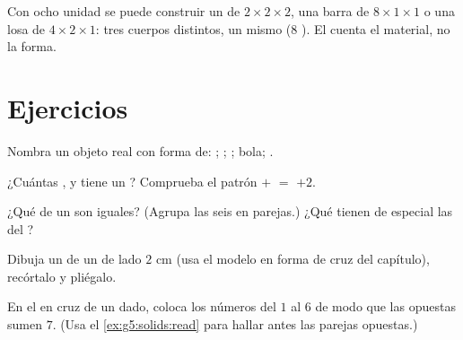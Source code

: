 \begin{example}\label{ex:g5:solids:rearrange}
Con ocho  unidad se puede construir un  de $2 \times 2 \times 2$, una
barra de $8 \times 1 \times 1$ o una losa de $4 \times 2 \times 1$: tres
cuerpos distintos, un mismo  ($8$ ). El  cuenta el
material, no la forma.
\end{example}

\section{Ejercicios}

\begin{exercise}[$\star$]\label{exo:g5:solids:1}
Nombra un objeto real con forma de: ; ; ; bola;
.
\end{exercise}

\begin{exercise}[$\star$]\label{exo:g5:solids:2}
¿Cuántas ,  y  tiene un ? Comprueba el patrón
 $+$  $=$  $+ 2$.
\end{exercise}

\begin{exercise}[$\star$]\label{exo:g5:solids:3}
¿Qué  de un  son iguales? (Agrupa las seis  en parejas.)
¿Qué tienen de especial las  del ?
\end{exercise}

\begin{exercise}[$\star$]\label{exo:g5:solids:4}
Dibuja un  de un  de lado $2$ cm (usa el modelo en forma de cruz
del capítulo), recórtalo y pliégalo.
\end{exercise}

\begin{exercise}[$\star$]\label{exo:g5:solids:5}
En el  en cruz de un dado, coloca los números del $1$ al $6$ de modo
que las  opuestas sumen $7$. (Usa el \cref{ex:g5:solids:read} para
hallar antes las parejas opuestas.)
\end{exercise}

